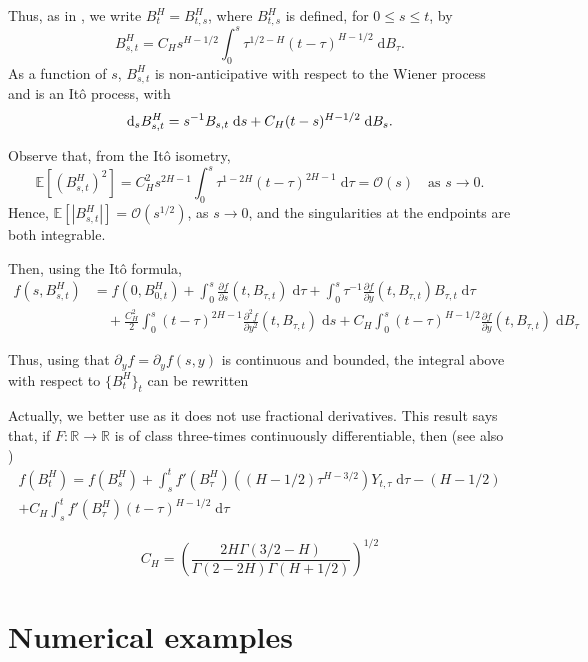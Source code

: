 \documentclass[reqno,12pt]{amsart}
\theoremstyle{plain}%
\theoremstyle{definition}
\begin{document}
Thus, as in \cite[Section 2.7.4]{Mishura2008}, we write $B^H_t = B^H_{t, s}$, where $B^H_{t, s}$ is defined, for $0 \leq s \leq t$, by
\[
    B^H_{s, t} = C_H s^{H-1/2}\int_0^s \tau^{1/2 - H}(t - \tau)^{H-1/2}\;\mathrm{d}B_\tau.
\]
As a function of $s$, $B^H_{s, t}$ is non-anticipative with respect to the Wiener process and is an It\^o process, with
\[
    \mathrm{d}_s B^H_{s, t} = s^{-1}B_{s, t}\;\mathrm{d}s \\
    + C_H (t - s)^{H-1/2}\;\mathrm{d}B_s.
\]

Observe that, from the It\^o isometry,
\[
    \mathbb{E}\left[(B^H_{s,t})^2\right] = C_H^2 s^{2H-1}\int_0^s \tau^{1 - 2H}(t - \tau)^{2H-1}\;\mathrm{d}\tau 
    = \mathcal{O}(s) \quad \text{as } s \rightarrow 0.
\]
Hence, $\mathbb{E}[|B^H_{s, t}|] = \mathcal{O}(s^{1/2})$, as $s\rightarrow 0$, and the singularities at the endpoints are both integrable.

Then, using the It\^o formula,
\begin{align*}
    f(s, B^H_{s, t})
    & = f(0, B^H_{0, t}) + \int_{0}^s \frac{\partial f}{\partial s}(t, B_{\tau, t})\;\mathrm{d}\tau + \int_{0}^s \tau^{-1}\frac{\partial f}{\partial y}(t, B_{\tau, t})B_{\tau, t}\;\mathrm{d}\tau \\
    & \quad + \frac{C_H^2}{2}\int_{0}^s (t - \tau)^{2H-1}\frac{\partial^2 f}{\partial y^2}(t, B_{\tau, t}) \;\mathrm{d}s + C_H \int_{0}^s (t - \tau)^{H-1/2}\frac{\partial f}{\partial y}(t, B_{\tau, t})\;\mathrm{d} B_\tau
\end{align*}

Thus, using that $\partial_y f = \partial_y f(s, y)$ is continuous and bounded, the integral above with respect to $\{B^H_t\}_t$ can be rewritten

Actually, we better use \cite[Theorem 2.7.6]{Mishura2008} as it does not use fractional derivatives. This result says that, if $F:\mathbb{R}\rightarrow\mathbb{R}$ is of class three-times continuously differentiable, then (see also \cite[Section 1.8]{Mishura2008})
\begin{multline}
    f(B^H_t) = f(B^H_s) + \int_s^t f'(B^H_\tau)\left((H-1/2)\tau^{H-3/2}\right)Y_{t,\tau}\;\mathrm{d}\tau -(H-1/2) \\
    + C_H\int_s^t f'(B^H_\tau)(t-\tau)^{H-1/2}\;\mathrm{d}\tau
\end{multline}

\[
    C_H = \left( \frac{2H\Gamma(3/2 - H)}{\Gamma(2 - 2H)\Gamma(H+1/2)} \right)^{1/2}
\]




\section{Numerical examples}
\end{document}
